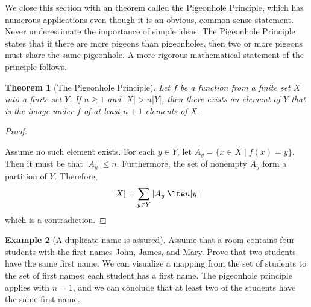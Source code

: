 \documentclass[10pt,]{book}
\theoremstyle{plain}
\newtheorem{theorem}{Theorem}[section]
\theoremstyle{definition}
\theoremstyle{definition}
\newtheorem{example}[theorem]{Example}
\theoremstyle{definition}
\begin{document}
We close this section with an theorem called the Pigeonhole Principle, which has numerous applications even though it is an obvious, common-sense statement. Never underestimate the importance of simple ideas. The Pigeonhole Principle states that if there are more pigeons than
pigeonholes, then two or more pigeons must share the same pigeonhole. A more rigorous mathematical statement of the principle follows.%
\begin{theorem}[The Pigeonhole Principle]\label{th-pigeonhole-principle}
Let \(f\) be a function from a finite set \(X\) into a finite set \(Y\). If \(n\geq 1\) and \(\lvert X\rvert > n\lvert Y\rvert\), then there exists an element of \(Y\) that is the image under \(f\) of at least \(n + 1\) elements of X.%
\end{theorem}
\begin{proof}\hypertarget{proof-1}{}
Assume no such element exists. For each \(y \in Y\), let \(A_y = \{x\in X \mid f(x) =y \}\).  Then it must be that \(\lvert A_y \rvert \leq n\).  Furthermore, the set of nonempty \(A_y\) form a partition of \(Y\).   Therefore,  
\[ \lvert X \rvert = \sum_{y\in Y}{\lvert A_y\rvert} \lte n \lvert y \rvert \]
which is a contradiction.%
\end{proof}
\begin{example}[A duplicate name is assured]\label{ex-names}
Assume that a room contains four students with the first names John, James, and Mary. Prove that two students have the same first name. We can visualize a mapping from the set of students to the set of first names; each student has a first name. The pigeonhole principle applies with \(n = 1\), and we can conclude that at least two of the students have the same first name.%
\end{example}
\typeout{************************************************}
\typeout{************************************************}
\end{document}
